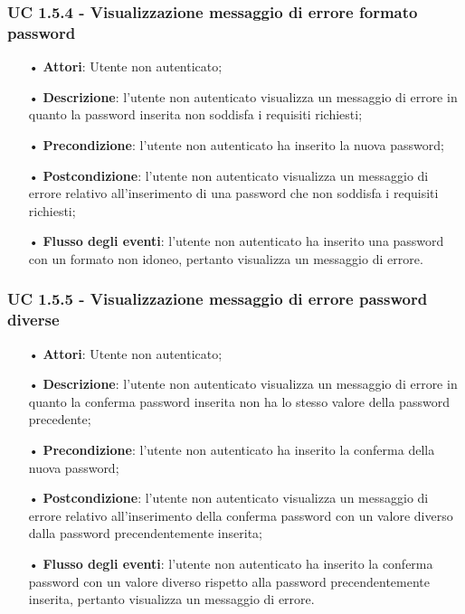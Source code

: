 \subsubsection{UC 1.5.4 - Visualizzazione messaggio di errore formato password}
\begin{itemize}
	\item[•]\textbf{Attori}: Utente non autenticato;
	\item[•]\textbf{Descrizione}: l’utente non autenticato visualizza un messaggio di errore in quanto la password inserita non soddisfa i requisiti richiesti;
	\item[•]\textbf{Precondizione}: l’utente non autenticato ha inserito la nuova password;
	\item[•]\textbf{Postcondizione}: l'utente non autenticato visualizza un messaggio di errore relativo all'inserimento di una password che non soddisfa i requisiti richiesti;
	\item[•]\textbf{Flusso degli eventi}: l'utente non autenticato ha inserito una password con un formato non idoneo, pertanto visualizza un messaggio di errore.
\end{itemize}

\subsubsection{UC 1.5.5 - Visualizzazione messaggio di errore password diverse}
\begin{itemize}
	\item[•]\textbf{Attori}: Utente non autenticato;
	\item[•]\textbf{Descrizione}: l’utente non autenticato visualizza un messaggio di errore in quanto la conferma password inserita non ha lo stesso valore della password precedente;
	\item[•]\textbf{Precondizione}: l’utente non autenticato ha inserito la conferma della nuova password;
	\item[•]\textbf{Postcondizione}: l'utente non autenticato visualizza un messaggio di errore relativo all'inserimento della conferma password con un valore diverso dalla password precendentemente inserita;
	\item[•]\textbf{Flusso degli eventi}: l'utente non autenticato ha inserito la conferma password con un valore diverso rispetto alla password precendentemente inserita, pertanto visualizza un messaggio di errore.
\end{itemize}

